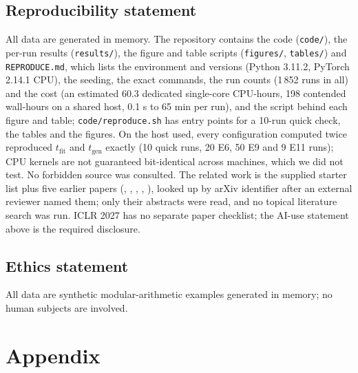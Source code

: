 \documentclass{article}
\begin{document}
\subsection*{Reproducibility statement}
All data are generated in memory. The repository contains the code (\texttt{code/}), the per-run results (\texttt{results/}), the figure and table scripts (\texttt{figures/}, \texttt{tables/}) and \texttt{REPRODUCE.md}, which lists the environment and versions (Python 3.11.2, PyTorch 2.14.1 CPU), the seeding, the exact commands, the run counts (1\,852 runs in all) and the cost (an estimated 60.3 dedicated single-core CPU-hours, 198 contended wall-hours on a shared host, 0.1 s to 65 min per run), and the script behind each figure and table; \texttt{code/reproduce.sh} has entry points for a 10-run quick check, the tables and the figures. On the host used, every configuration computed twice reproduced $t_{\mathrm{fit}}$ and $t_{\mathrm{gen}}$ exactly (10 quick runs, 20 E6, 50 E9 and 9 E11 runs); CPU kernels are not guaranteed bit-identical across machines, which we did not test. No forbidden source was consulted. The related work is the supplied starter list plus five earlier papers (\citealp{liu2022towards}, \citealp{gromov2023grokking}, \citealp{thilak2022slingshot}, \citealp{zhong2023clock}, \citealp{merrill2023tale}), looked up by arXiv identifier after an external reviewer named them; only their abstracts were read, and no topical literature search was run. ICLR 2027 has no separate paper checklist; the AI-use statement above is the required disclosure.

\subsection*{Ethics statement}
All data are synthetic modular-arithmetic examples generated in memory; no human subjects are involved.




\appendix
\section{Appendix}
\end{document}
